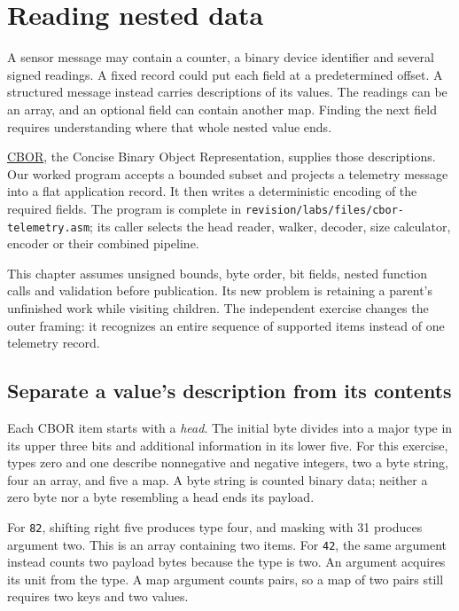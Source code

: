 \chapter{Reading nested data}
\label{revision:cbor}

A sensor message may contain a counter, a binary device identifier and several
signed readings. A fixed record could put each field at a predetermined offset.
A structured message instead carries descriptions of its values. The readings
can be an array, and an optional field can contain another map. Finding the next
field requires understanding where that whole nested value ends.

\href{https://www.rfc-editor.org/rfc/rfc8949.html}{CBOR}, the Concise Binary Object
Representation, supplies those descriptions. Our worked program accepts a bounded
subset and projects a telemetry message into a flat application record. It then
writes a deterministic encoding of the required fields. The program is complete
in \texttt{revision/labs/files/cbor-telemetry.asm}; its caller selects the head
reader, walker, decoder, size calculator, encoder or their combined pipeline.

This chapter assumes unsigned bounds, byte order, bit fields, nested function
calls and validation before publication. Its new problem is retaining a parent's
unfinished work while visiting children. The independent exercise changes the
outer framing: it recognizes an entire sequence of supported items instead of
one telemetry record.

\section{Separate a value's description from its contents}

Each CBOR item starts with a \emph{head}. The initial byte divides into a major
type in its upper three bits and additional information in its lower five.
For this exercise, types zero and one describe nonnegative and negative integers,
two a byte string, four an array, and five a map. A byte string is counted binary
data; neither a zero byte nor a byte resembling a head ends its payload.

For \texttt{82}, shifting right five produces type four, and masking with 31
produces argument two. This is an array containing two items. For \texttt{42},
the same argument instead counts two payload bytes because the type is two.
An argument acquires its unit from the type. A map argument counts pairs, so a
map of two pairs still requires two keys and two values.

